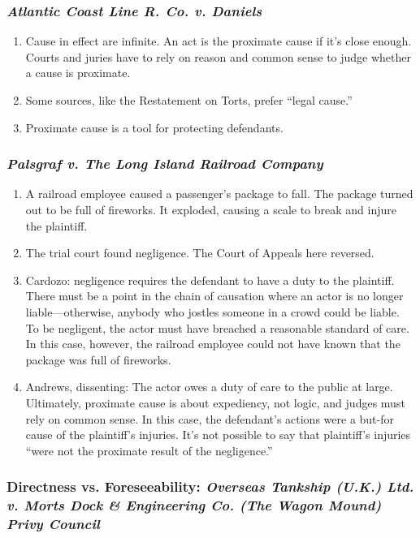 \subsubsection{\emph{Atlantic Coast Line R. Co. v. Daniels}}

\begin{enumerate}
    \item Cause in effect are infinite. An act is the proximate cause if it's close enough. Courts and juries have to rely on reason and common sense to judge whether a cause is proximate.
    \item Some sources, like the Restatement on Torts, prefer ``legal cause.''
    \item Proximate cause is a tool for protecting defendants.
\end{enumerate}

\subsubsection{\emph{Palsgraf v. The Long Island Railroad Company}}

\begin{enumerate}
    \item A railroad employee caused a passenger's package to fall. The package turned out to be full of fireworks. It exploded, causing a scale to break and injure the plaintiff.
    \item The trial court found negligence. The Court of Appeals here reversed.
    \item Cardozo: negligence requires the defendant to have a duty to the plaintiff. There must be a point in the chain of causation where an actor is no longer liable---otherwise, anybody who jostles someone in a crowd could be liable. To be negligent, the actor must have breached a reasonable standard of care. In this case, however, the railroad employee could not have known that the package was full of fireworks.
    \item Andrews, dissenting: The actor owes a duty of care to the public at large. Ultimately, proximate cause is about expediency, not logic, and judges must rely on common sense. In this case, the defendant's actions were a but-for cause of the plaintiff's injuries. It's not possible to say that plaintiff's injuries ``were not the proximate result of the negligence.''
\end{enumerate}

\subsubsection{Directness vs. Foreseeability: \emph{Overseas Tankship (U.K.) Ltd. v. Morts Dock \& Engineering Co. (The Wagon Mound) Privy Council}}

